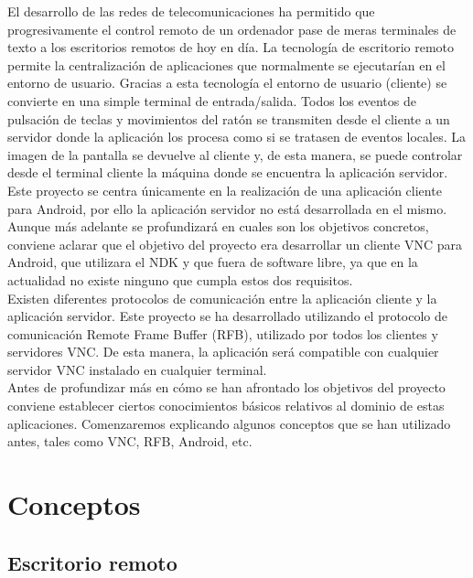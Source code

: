 El desarrollo de las redes de telecomunicaciones ha permitido que progresivamente el control remoto de un ordenador pase de meras terminales de texto a los escritorios remotos de hoy en día. La tecnología de escritorio remoto permite la centralización de aplicaciones que normalmente se ejecutarían en el entorno de usuario. Gracias a esta tecnología el entorno de usuario (cliente) se convierte en una simple terminal de entrada/salida. Todos los eventos de pulsación de teclas y movimientos del ratón se transmiten desde el cliente a un servidor donde la aplicación los procesa como si se tratasen de eventos locales. La imagen de la pantalla se devuelve al cliente y, de esta manera, se puede controlar desde el terminal cliente la máquina donde se encuentra la aplicación servidor.\\

Este proyecto se centra únicamente en la realización de una aplicación cliente para Android, por ello la aplicación servidor no está desarrollada en el mismo. Aunque más adelante se profundizará en cuales son los objetivos concretos, conviene aclarar que el objetivo del proyecto era desarrollar un cliente VNC para Android, que utilizara el NDK y que fuera de software libre, ya que en la actualidad no existe ninguno que cumpla estos dos requisitos.\\

Existen diferentes protocolos de comunicación entre la aplicación cliente y la aplicación servidor. Este proyecto se ha desarrollado utilizando el protocolo de comunicación Remote Frame Buffer (RFB), utilizado por todos los clientes y servidores VNC. De esta manera, la aplicación será compatible con cualquier servidor VNC instalado en cualquier terminal.\\

Antes de profundizar más en cómo se han afrontado los objetivos del proyecto conviene establecer ciertos conocimientos básicos relativos al dominio de estas aplicaciones. Comenzaremos explicando algunos conceptos que se han utilizado antes, tales como VNC, RFB, Android, etc.

\section{Conceptos}

\subsection{Escritorio remoto}

